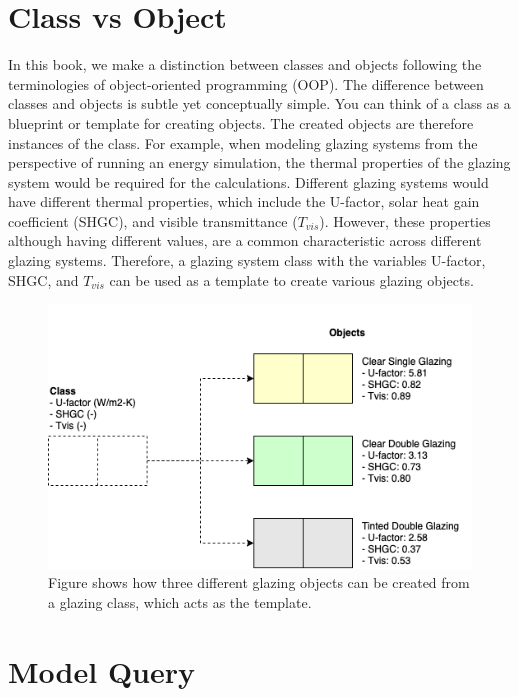\documentclass[
]{book}
\begin{document}
\hypertarget{class-vs-object}{%
\section{Class vs Object}\label{class-vs-object}}

In this book, we make a distinction between classes and objects following the terminologies of object-oriented programming (OOP). The difference between classes and objects is subtle yet conceptually simple. You can think of a class as a blueprint or template for creating objects. The created objects are therefore instances of the class. For example, when modeling glazing systems from the perspective of running an energy simulation, the thermal properties of the glazing system would be required for the calculations. Different glazing systems would have different thermal properties, which include the U-factor, solar heat gain coefficient (SHGC), and visible transmittance (\(T_{vis}\)). However, these properties although having different values, are a common characteristic across different glazing systems. Therefore, a glazing system class with the variables U-factor, SHGC, and \(T_{vis}\) can be used as a template to create various glazing objects.

\begin{figure}

{\centering \includegraphics[width=0.8\linewidth]{figures/class_object} 

}

\caption{Figure shows how three different glazing objects can be created from a glazing class, which acts as the template.}\label{fig:class-object}
\end{figure}

\hypertarget{model-query}{%
\section{Model Query}\label{model-query}}
\end{document}
